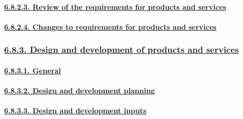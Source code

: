 \documentclass[
]{article}
\begin{document}
\hypertarget{review-of-the-requirements-for-products-and-services}{%
\paragraph{\texorpdfstring{\protect\hyperlink{review-of-the-requirements-for-products-and-services-1}{6.8.2.3.
Review of the requirements for products and
services}}{6.8.2.3. Review of the requirements for products and services}}\label{review-of-the-requirements-for-products-and-services}}

\hypertarget{changes-to-requirements-for-products-and-services}{%
\paragraph{\texorpdfstring{\protect\hyperlink{changes-to-requirements-for-products-and-services-1}{6.8.2.4.
Changes to requirements for products and
services}}{6.8.2.4. Changes to requirements for products and services}}\label{changes-to-requirements-for-products-and-services}}

\hypertarget{design-and-development-of-products-and-services}{%
\subsubsection{\texorpdfstring{\protect\hyperlink{design-and-development-of-products-and-services-1}{6.8.3.
Design and development of products and
services}}{6.8.3. Design and development of products and services}}\label{design-and-development-of-products-and-services}}

\hypertarget{general-4}{%
\paragraph{\texorpdfstring{\protect\hyperlink{general-13}{6.8.3.1.
General}}{6.8.3.1. General}}\label{general-4}}

\hypertarget{design-and-development-planning}{%
\paragraph{\texorpdfstring{\protect\hyperlink{design-and-development-planning-1}{6.8.3.2.
Design and development
planning}}{6.8.3.2. Design and development planning}}\label{design-and-development-planning}}

\hypertarget{design-and-development-inputs}{%
\paragraph{\texorpdfstring{\protect\hyperlink{design-and-development-inputs-1}{6.8.3.3.
Design and development
inputs}}{6.8.3.3. Design and development inputs}}\label{design-and-development-inputs}}
\end{document}
